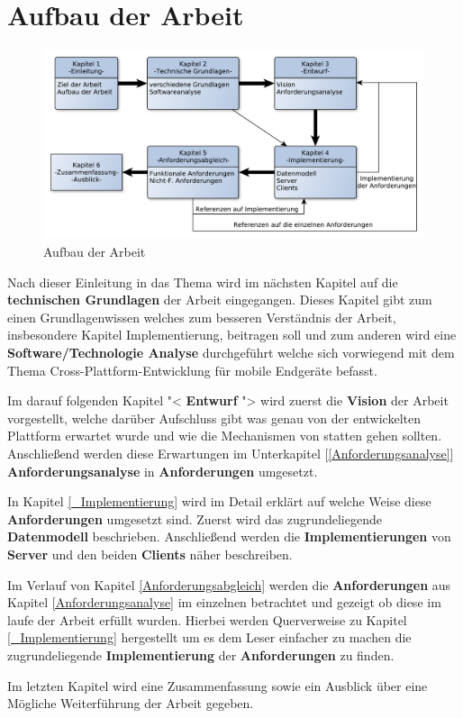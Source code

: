 \section{Aufbau der Arbeit}
\begin{figure}[H]
	\centering
	\includegraphics[scale=0.55]{images/AufbauDerArbeit}
	\caption[Aufbau der Arbeit]{Aufbau der Arbeit}
	\label{AufbauDerArbeit}
\end{figure}
Nach dieser Einleitung in das Thema wird im nächsten Kapitel auf die \textbf{technischen Grundlagen} der Arbeit eingegangen. Dieses Kapitel gibt zum einen Grundlagenwissen welches zum besseren Verständnis der Arbeit, insbesondere Kapitel Implementierung, beitragen soll und zum anderen wird eine \textbf{Software/Technologie Analyse} durchgeführt welche sich vorwiegend mit dem Thema Cross-Plattform-Entwicklung für mobile Endgeräte befasst.

Im darauf folgenden Kapitel "< \textbf{Entwurf} "> wird zuerst die \textbf{Vision} der Arbeit vorgestellt, welche darüber Aufschluss gibt was genau von der entwickelten Plattform erwartet wurde und wie die Mechanismen von statten gehen sollten. Anschließend werden diese Erwartungen im Unterkapitel [\ref{Anforderungsanalyse}] \textbf{Anforderungsanalyse} in \textbf{Anforderungen} umgesetzt. 

In Kapitel \ref{_Implementierung} wird im Detail erklärt auf welche Weise diese \textbf{Anforderungen} umgesetzt sind. Zuerst wird das zugrundeliegende \textbf{Datenmodell} beschrieben. Anschließend werden die \textbf{Implementierungen} von \textbf{Server} und den beiden \textbf{Clients} näher beschreiben.

Im Verlauf von Kapitel \ref{Anforderungsabgleich} werden die \textbf{Anforderungen} aus Kapitel \ref{Anforderungsanalyse} im einzelnen betrachtet und gezeigt ob diese im laufe der Arbeit erfüllt wurden. Hierbei werden Querverweise zu Kapitel \ref{_Implementierung} hergestellt um es dem Leser einfacher zu machen die zugrundeliegende \textbf{Implementierung} der \textbf{Anforderungen} zu finden.

Im letzten Kapitel wird eine Zusammenfassung sowie ein Ausblick über eine Mögliche Weiterführung der Arbeit gegeben.

